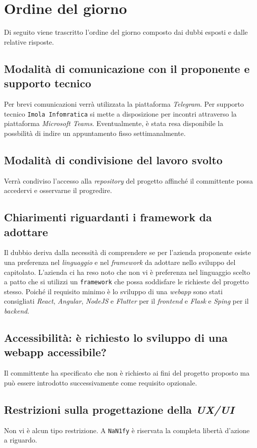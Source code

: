 \section{Ordine del giorno}
Di seguito viene trascritto l'ordine del giorno composto dai dubbi esposti e dalle relative risposte.
\subsection{Modalità di comunicazione con il proponente e supporto tecnico}
    Per brevi comunicazioni verrà utilizzata la piattaforma \textit{Telegram}. Per supporto tecnico \texttt{Imola Infomratica} si mette a disposizione per incontri attraverso la piattaforma \textit{Microsoft Teams}. Eventualmente, è stata resa disponibile la possbilità di indire un appuntamento fisso settimanalmente.
\subsection{Modalità di condivisione del lavoro svolto}
    Verrà condiviso l'accesso alla \textit{repository} del progetto affinché il committente possa accedervi e osservarne il progredire. 
\subsection{Chiarimenti riguardanti i framework da adottare}
    Il dubbio deriva dalla necessità di comprendere se per l'azienda proponente esiste una preferenza nel \textit{linguaggio} e nel \textit{framework} da adottare nello sviluppo del capitolato. L'azienda ci ha reso noto che non vi è preferenza nel linguaggio scelto a patto che si utilizzi un \texttt{framework} che possa soddisfare le richieste del progetto stesso. Poiché il requisito minimo è lo sviluppo di una \textit{webapp} sono stati consigliati \textit{React}, \textit{Angular}, \textit{NodeJS} e \textit{Flutter} per il \textit{frontend} e \textit{Flask} e \textit{Sping} per il \textit{backend}.
\subsection{Accessibilità: è richiesto lo sviluppo di una webapp accessibile?}
    Il committente ha specificato che non è richiesto ai fini del progetto proposto ma può essere introdotto successivamente come requisito opzionale.
\subsection{Restrizioni sulla progettazione della \textit{UX/UI}}
    Non vi è alcun tipo restrizione. A \texttt{NaN1fy} è riservata la completa libertà d'azione a riguardo.
